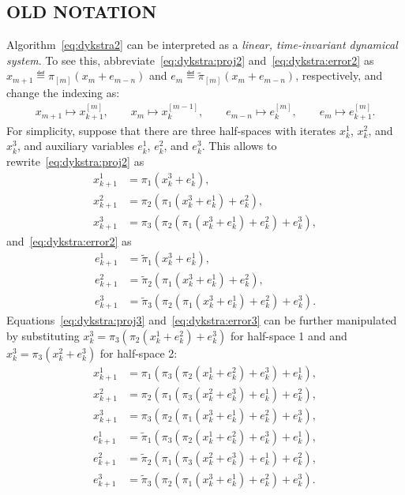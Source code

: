 \documentclass[hidelinks]{article}
\begin{document}
\newpage
\subsection{OLD NOTATION}

Algorithm~\eqref{eq:dykstra2} can be interpreted as a \textit{linear, time-invariant dynamical system}. To see this, abbreviate~\eqref{eq:dykstra:proj2} and~\eqref{eq:dykstra:error2} as $x_{m+1}\eqdef\pi_{[m]}(x_{m}+e_{m-n})$ and $e_{m}\eqdef\tilde{\pi}_{[m]}(x_{m}+e_{m-n})$, respectively, and change the indexing as:
\begin{align}
x_{m+1} \mapsto x_{k+1}^{[m]},\qquad x_{m} \mapsto x_{k}^{[m-1]},\qquad
e_{m-n} \mapsto e_{k}^{[m]},\qquad e_{m} \mapsto e_{k+1}^{[m]}.
\end{align}
For simplicity, suppose that there are three half-spaces with iterates $x_k^1$, $x_k^2$, and $x_k^3$, and auxiliary variables $e_k^1$, $e_k^2$, and $e_k^3$. This allows to rewrite~\eqref{eq:dykstra:proj2} as
\begin{subequations}
\begin{align}
x_{k+1}^1 &= \pi_1(x_k^3+e_k^1),\\
x_{k+1}^2 &= \pi_2(\pi_1(x_k^3+e_k^1)+e_k^2),\\
x_{k+1}^3 &= \pi_3(\pi_2(\pi_1(x_k^3+e_k^1)+e_k^2)+e_k^3),
\end{align}\label{eq:dykstra:proj3}
\end{subequations}
and~\eqref{eq:dykstra:error2} as
\begin{subequations}
\begin{align}
e_{k+1}^1 &= \tilde{\pi}_1(x_k^3+e_k^1),\\
e_{k+1}^2 &= \tilde{\pi}_2(\pi_1(x_k^3+e_k^1)+e_k^2),\\
e_{k+1}^3 &= \tilde{\pi}_3(\pi_2(\pi_1(x_k^3+e_k^1)+e_k^2)+e_k^3).
\end{align}\label{eq:dykstra:error3}
\end{subequations}
Equations~\eqref{eq:dykstra:proj3} and~\eqref{eq:dykstra:error3} can be further manipulated by substituting $x_k^3=\pi_3(\pi_2(x_k^1+e_k^2)+e_k^3)$ for half-space 1 and and $x_k^3=\pi_3(x_k^2+e_k^3)$ for half-space 2:
\begin{subequations}
\begin{align}
x_{k+1}^1 &= \pi_1(\pi_3(\pi_2(x_k^1+e_k^2)+e_k^3)+e_k^1),\\
x_{k+1}^2 &= \pi_2(\pi_1(\pi_3(x_k^2+e_k^3)+e_k^1)+e_k^2),\\
x_{k+1}^3 &= \pi_3(\pi_2(\pi_1(x_k^3+e_k^1)+e_k^2)+e_k^3),\\
e_{k+1}^1 &= \tilde{\pi}_1(\pi_3(\pi_2(x_k^1+e_k^2)+e_k^3)+e_k^1),\\
e_{k+1}^2 &= \tilde{\pi}_2(\pi_1(\pi_3(x_k^2+e_k^3)+e_k^1)+e_k^2),\\
e_{k+1}^3 &= \tilde{\pi}_3(\pi_2(\pi_1(x_k^3+e_k^1)+e_k^2)+e_k^3).
\end{align}\label{eq:dykstra4}
\end{subequations}
\end{document}
